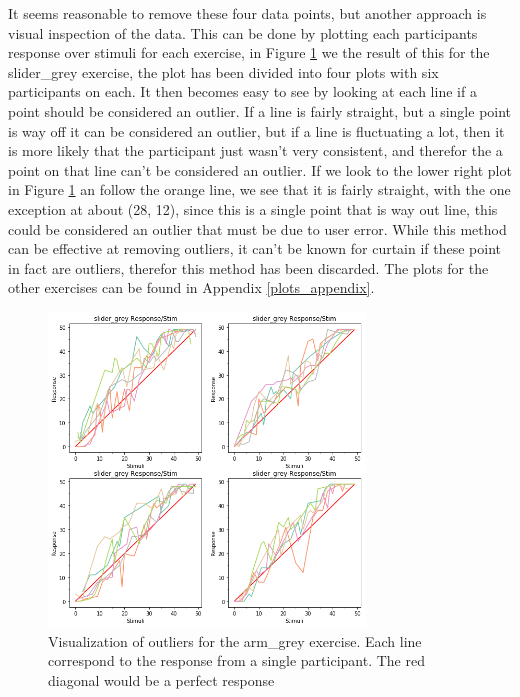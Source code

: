 It seems reasonable to remove these four data points, but another approach is visual inspection of the data. This can be done by plotting each participants response over stimuli for each exercise, in Figure \ref{visual_out} we the result of this for the slider\_grey exercise, the plot has been divided into four plots with six participants on each. It then becomes easy to see by looking at each line if a point should be considered an outlier. If a line is fairly straight, but a single point is way off it can be considered an outlier, but if a line is fluctuating a lot, then it is more likely that the participant just wasn't very consistent, and therefor the a point on that line can't be considered an outlier. If we look to the lower right plot in Figure \ref{visual_out} an follow the orange line, we see that it is fairly straight, with the one exception at about (28, 12), since this is a single point that is way out line, this could be considered an outlier that must be due to user error. While this method can be effective at removing outliers, it can't be known for curtain if these point in fact are outliers, therefor this method has been discarded. The plots for the other exercises can be found in Appendix \ref{plots_appendix}.

\begin{figure}[]
    \centering
    \includegraphics[width=0.75\textwidth]{figures/visual_out1.png}
    \caption{Visualization of outliers for the arm\_grey exercise. Each line correspond to the response from a single participant. The red diagonal would be a perfect response}
    \label{visual_out}
\end{figure}

